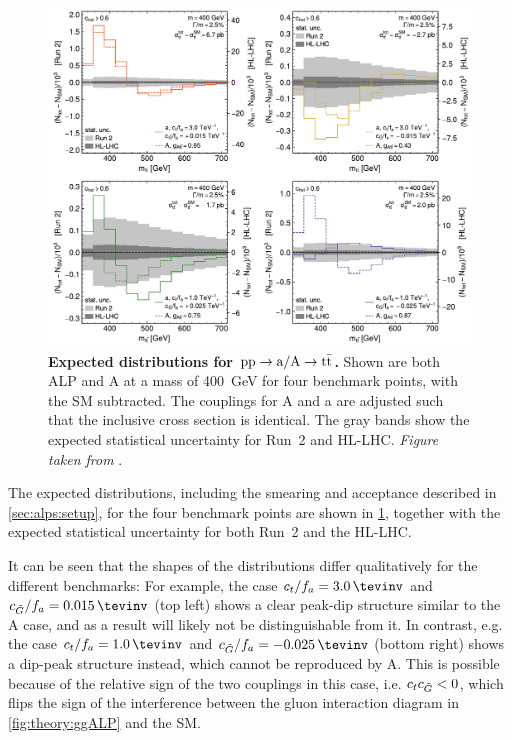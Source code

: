 \begin{figure}[t]
    \centering
    \includegraphics[width=0.99\linewidth]{figures/alps/mttplots.pdf}
    \caption{\textbf{Expected \mtt distributions for $\mathrm{pp \rightarrow a/A \rightarrow \mathrm{t \bar{t}}}$.} Shown are both ALP and A at a mass of \SI{400}{\GeV} for four benchmark points, with the SM subtracted. The couplings for A and a are adjusted such that the inclusive cross section is identical. The gray bands show the expected statistical uncertainty for Run~2 and HL-LHC. \textit{Figure taken from }.}
    \label{fig:alps:mttplots}
\end{figure}

The expected \mtt distributions, including the smearing and acceptance described in \cref{sec:alps:setup}, for the four benchmark points are shown in \cref{fig:alps:mttplots}, together with the expected statistical uncertainty for both Run~2 and the HL-LHC. 

It can be seen that the shapes of the distributions differ qualitatively for the different benchmarks: For example, the case $\ct/f_a = \SI{3.0}{\tevinv}$ and $\cG/f_a = \SI{+0.015}{\tevinv}$ (top left) shows a clear peak-dip structure similar to the A case, and as a result will likely not be distinguishable from it. In contrast, e.g. the case $\ct/f_a = \SI{1.0}{\tevinv}$ and $\cG/f_a = \SI{-0.025}{\tevinv}$ (bottom right) shows a dip-peak structure instead, which cannot be reproduced by A. This is possible because of the relative sign of the two couplings in this case, i.e. $c_t c_{\tilde{G}} < 0$, which flips the sign of the interference between the gluon interaction diagram in \cref{fig:theory:ggALP} and the SM. 

